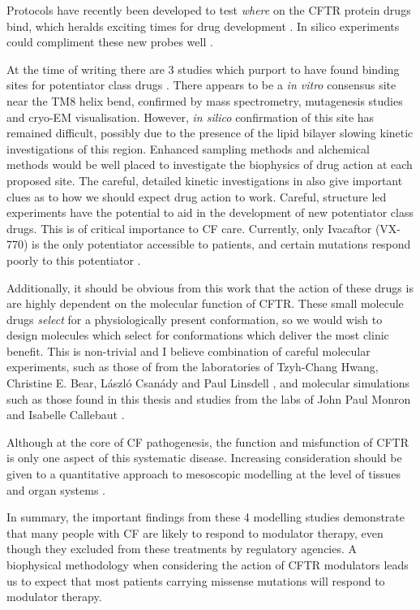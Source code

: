 Protocols have recently been developed to test \textit{where} on the CFTR protein drugs bind, which heralds exciting times for drug development \cite{laselva2022}. In silico experiments could compliment these new probes well \cite{}.

At the time of writing there are 3 studies which purport to have found binding sites for potentiator class drugs \cite{}. There appears to be a \textit {in vitro} consensus site near the TM8 helix bend, confirmed by mass spectrometry, mutagenesis studies and cryo-EM visualisation. However, \textit{in silico} confirmation of this site has remained difficult, possibly due to the presence of the lipid bilayer slowing kinetic investigations of this region. Enhanced sampling methods and alchemical methods would be well placed to investigate the biophysics of drug action at each proposed site. The careful, detailed kinetic investigations in \cite{csanady2019} also give important clues as to how we should expect drug action to work. Careful, structure led experiments have the potential to aid in the development of new potentiator class drugs. This is of critical importance to CF care. Currently, only Ivacaftor (VX-770)  is the only potentiator accessible to patients, and certain mutations respond poorly to this potentiator \cite{phuan2018, vangoor2014}. 

Additionally, it should be obvious from this work that the action of these drugs is are highly dependent on the molecular function of CFTR. These small molecule drugs \textit{select} for a physiologically present conformation, so we would wish to design molecules which select for conformations which deliver the most clinic benefit. This is non-trivial and I believe  combination of careful molecular experiments, such as those of from the laboratories of Tzyh-Chang Hwang,  Christine E. Bear, L\'aszl\'o Csan\'ady and Paul Linsdell \cite{linsdell2018, csanady2019, zhang2017b}, and molecular simulations such as those found in this thesis and studies from the labs of John Paul Monron and Isabelle Callebaut \cite{hoffmann2018}.

Although at the core of CF pathogenesis, the function and misfunction of CFTR is only one aspect of this systematic disease. Increasing consideration should be given to a quantitative approach to mesoscopic modelling at the level of tissues and organ systems \cite{volt2014}.

In summary, the important findings from these 4 modelling studies demonstrate that many people with CF are likely to respond to modulator therapy, even though they excluded from these treatments by regulatory agencies. A biophysical methodology when considering the action of CFTR modulators leads us to expect that most patients carrying missense mutations will respond to modulator therapy.


